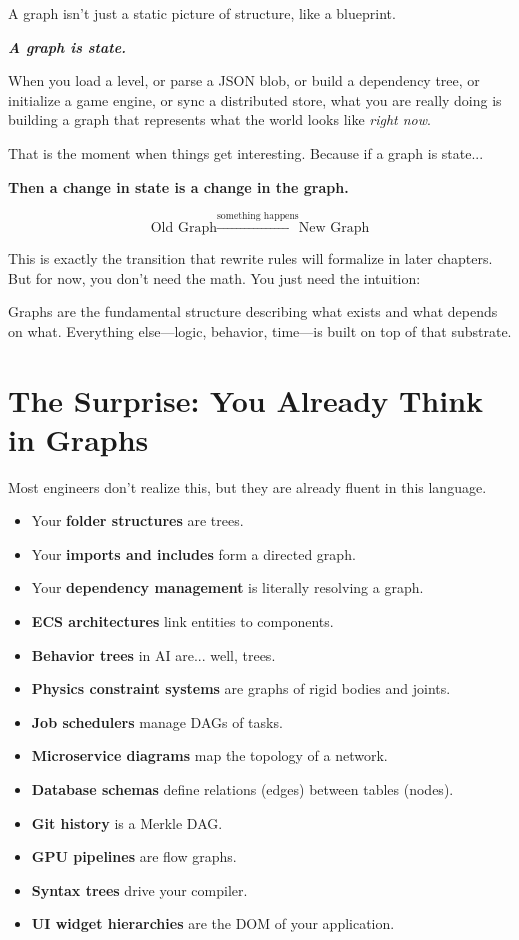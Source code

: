 A graph isn't just a static picture of structure, like a blueprint.

\textbf{\textit{A graph is state.}}

When you load a level, or parse a JSON blob, or build a dependency tree, or initialize a game engine, or sync a distributed store, what you are really doing is building a graph that represents what the world looks like \textit{right now}.

That is the moment when things get interesting. Because if a graph is state...

\textbf{Then a change in state is a change in the graph.}

\[ \text{Old Graph} \xrightarrow{\text{something happens}} \text{New Graph} \]

This is exactly the transition that rewrite rules will formalize in later chapters. But for now, you don't need the math. You just need the intuition:

Graphs are the fundamental structure describing what exists and what depends on what. Everything else—logic, behavior, time—is built on top of that substrate.

\section{The Surprise: You Already Think in Graphs}
\label{sec:you-already-think-graphs}

Most engineers don't realize this, but they are already fluent in this language.
\begin{itemize}
    \item Your \textbf{folder structures} are trees.
    \item Your \textbf{imports and includes} form a directed graph.
    \item Your \textbf{dependency management} is literally resolving a graph.
    \item \textbf{ECS architectures} link entities to components.
    \item \textbf{Behavior trees} in AI are... well, trees.
    \item \textbf{Physics constraint systems} are graphs of rigid bodies and joints.
    \item \textbf{Job schedulers} manage DAGs of tasks.
    \item \textbf{Microservice diagrams} map the topology of a network.
    \item \textbf{Database schemas} define relations (edges) between tables (nodes).
    \item \textbf{Git history} is a Merkle DAG.
    \item \textbf{GPU pipelines} are flow graphs.
    \item \textbf{Syntax trees} drive your compiler.
    \item \textbf{UI widget hierarchies} are the DOM of your application.
\end{itemize}

